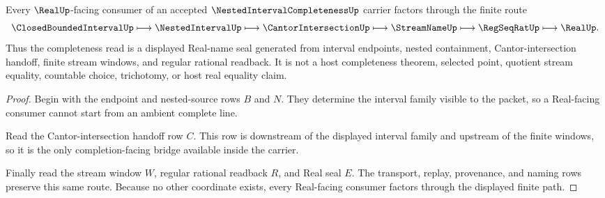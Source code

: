 \begin{theorem}
\label{thm:nested-interval-completeness-real-seal}
Every $\RealUp$-facing consumer of an accepted $\NestedIntervalCompletenessUp$ carrier factors through the finite route
$$
\ClosedBoundedIntervalUp \longmapsto \NestedIntervalUp \longmapsto \CantorIntersectionUp \longmapsto \StreamNameUp \longmapsto \RegSeqRatUp \longmapsto \RealUp .
$$
Thus the completeness read is a displayed Real-name seal generated from interval endpoints, nested containment, Cantor-intersection handoff, finite stream windows, and regular rational readback. It is not a host completeness theorem, selected point, quotient stream equality, countable choice, trichotomy, or host real equality claim.
\end{theorem}
\begin{proof}
Begin with the endpoint and nested-source rows $B$ and $N$. They determine the interval family visible to the packet, so a Real-facing consumer cannot start from an ambient complete line.

Read the Cantor-intersection handoff row $C$. This row is downstream of the displayed interval family and upstream of the finite windows, so it is the only completion-facing bridge available inside the carrier.

Finally read the stream window $W$, regular rational readback $R$, and Real seal $E$. The transport, replay, provenance, and naming rows preserve this same route. Because no other coordinate exists, every Real-facing consumer factors through the displayed finite path.
\end{proof}

